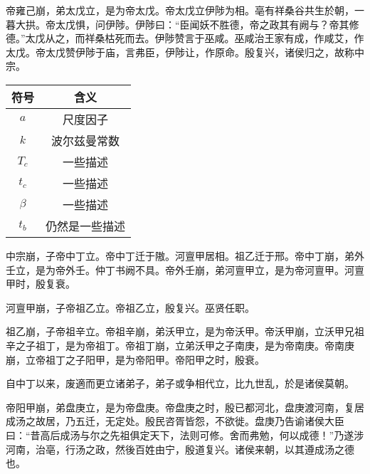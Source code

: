 \documentclass[UTF8,12pt,AutoFakeBold]{ctexart}
\begin{document}
帝雍己崩，弟太戊立，是为帝太戊。帝太戊立伊陟为相。亳有祥桑谷共生於朝，一暮大拱。帝太戊惧，问伊陟。伊陟曰：“臣闻妖不胜德，帝之政其有阙与？帝其修德。”太戊从之，而祥桑枯死而去。伊陟赞言于巫咸。巫咸治王家有成，作咸艾，作太戊。帝太戊赞伊陟于庙，言弗臣，伊陟让，作原命。殷复兴，诸侯归之，故称中宗。
\begin{table}[htb]
    \centering
    \captionsetup{font=footnotesize}
    \label{表：符号对照表}
    \begin{tabular}{@{}cc@{}}
        \toprule
        符号          & 含义                                                              \\ \midrule
        $a$         & 尺度因子                                                            \\
        $k$         & 波尔兹曼常数                                                          \\
        $T_c$       & 一些描述                                                   \\
        $t_c$       & 一些描述                                                   \\
        $\beta$     & 一些描述                                           \\
        $t_b$       & 仍然是一些描述                                                        \\ \bottomrule
    \end{tabular}
\end{table}
中宗崩，子帝中丁立。帝中丁迁于隞。河亶甲居相。祖乙迁于邢。帝中丁崩，弟外壬立，是为帝外壬。仲丁书阙不具。帝外壬崩，弟河亶甲立，是为帝河亶甲。河亶甲时，殷复衰。

河亶甲崩，子帝祖乙立。帝祖乙立，殷复兴。巫贤任职。

祖乙崩，子帝祖辛立。帝祖辛崩，弟沃甲立，是为帝沃甲。帝沃甲崩，立沃甲兄祖辛之子祖丁，是为帝祖丁。帝祖丁崩，立弟沃甲之子南庚，是为帝南庚。帝南庚崩，立帝祖丁之子阳甲，是为帝阳甲。帝阳甲之时，殷衰。

自中丁以来，废適而更立诸弟子，弟子或争相代立，比九世乱，於是诸侯莫朝。

帝阳甲崩，弟盘庚立，是为帝盘庚。帝盘庚之时，殷已都河北，盘庚渡河南，复居成汤之故居，乃五迁，无定处。殷民咨胥皆怨，不欲徙。盘庚乃告谕诸侯大臣曰：“昔高后成汤与尔之先祖俱定天下，法则可修。舍而弗勉，何以成德！”乃遂涉河南，治亳，行汤之政，然後百姓由宁，殷道复兴。诸侯来朝，以其遵成汤之德也。
\end{document}
